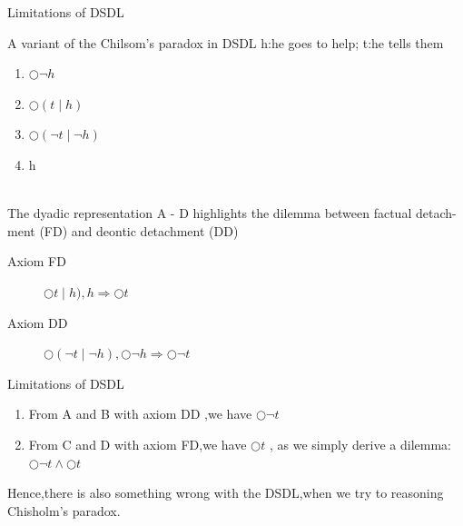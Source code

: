 \documentclass{beamer}
\begin{document}
\begin{frame}{Limitations of DSDL}
\begin{block}{A variant of the Chilsom's paradox in DSDL}
h:he goes to help; t:he tells them
\begin{enumerate}
\item[A]$\bigcirc \neg h$
\item[B]$\bigcirc( t \mid  h)$
\item[C]$\bigcirc(\neg t\mid \neg h)$
\item[D]h
\end{enumerate}
\end{block}
\\
The dyadic representation A - D highlights the dilemma between factual detach-ment (FD) and deontic detachment (DD)
\begin{description}
\item[Axiom FD]$\bigcirc t\mid h),h \Rightarrow \bigcirc t$\\
\item[Axiom DD]$\bigcirc(\neg t\mid \neg h), \bigcirc\neg h \Rightarrow \bigcirc\neg t$\\
\end{description}
\end{frame}
\begin{frame}{Limitations of DSDL}
\begin{enumerate}
    \item From A and B with axiom DD ,we have $\bigcirc\neg  t$
    \item From C and D with axiom FD,we have $\bigcirc t$ , as we simply derive a dilemma:$\bigcirc\neg t\wedge\bigcirc t$\\
\end{enumerate}
Hence,there is also something wrong with the DSDL,when we try to reasoning Chisholm's paradox.\\

\end{frame}
\end{document}
